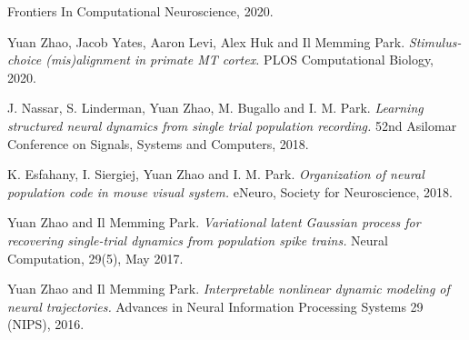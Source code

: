 \documentclass[11pt]{article}
\begin{document}
\begin{enumerate}[label={[\arabic*]}]
          Frontiers In Computational Neuroscience, 2020.
    \item Yuan Zhao, Jacob Yates, Aaron Levi, Alex Huk and Il Memming Park. 
          \textit{Stimulus-choice (mis)alignment in primate MT cortex.}
          PLOS Computational Biology, 2020.
    \item J. Nassar, S. Linderman, Yuan Zhao, M. Bugallo and I. M. Park.
          \textit{Learning structured neural dynamics from single trial population recording.}
          52nd Asilomar Conference on Signals, Systems and Computers, 2018.
    \item K. Esfahany, I. Siergiej, Yuan Zhao and I. M. Park.
          \textit{Organization of neural population code in mouse visual system.}
          eNeuro, Society for Neuroscience, 2018.
    \item Yuan Zhao and Il Memming Park. 
          \textit{Variational latent Gaussian process for recovering single-trial dynamics from population spike trains.}
          Neural Computation, 29(5), May 2017.
    \item Yuan Zhao and Il Memming Park. 
          \textit{Interpretable nonlinear dynamic modeling of neural trajectories.} 
          Advances in Neural Information Processing Systems 29 (NIPS), 2016.
\end{enumerate}
\end{document}
